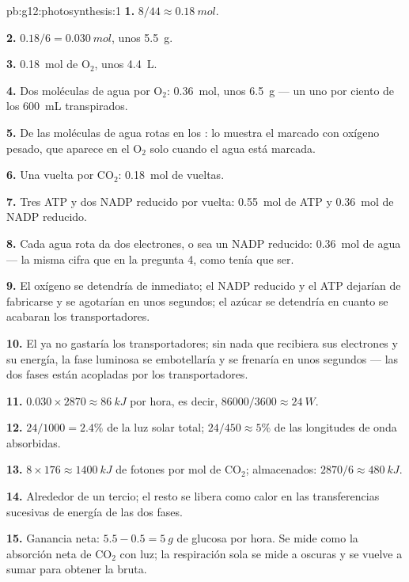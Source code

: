 \begin{solution}{pb:g12:photosynthesis:1}
\textbf{1.} $8/44 \approx \qty{0.18}{mol}$.

\textbf{2.} $0.18/6 = \qty{0.030}{mol}$, unos \qty{5.5}{g}.

\textbf{3.} \qty{0.18}{mol} de $\mathrm{O_2}$, unos \qty{4.4}{L}.

\textbf{4.} Dos moléculas de agua por $\mathrm{O_2}$: \qty{0.36}{mol},
unos \qty{6.5}{g} --- un uno por ciento de los \qty{600}{mL}
transpirados.

\textbf{5.} De las moléculas de agua rotas en los : lo
muestra el marcado con oxígeno pesado, que aparece en el
$\mathrm{O_2}$ solo cuando el agua está marcada.

\textbf{6.} Una vuelta por $\mathrm{CO_2}$: \qty{0.18}{mol} de vueltas.

\textbf{7.} Tres ATP y dos NADP reducido por vuelta: \qty{0.55}{mol} de
ATP y \qty{0.36}{mol} de NADP reducido.

\textbf{8.} Cada agua rota da dos electrones, o sea un NADP reducido:
\qty{0.36}{mol} de agua --- la misma cifra que en la pregunta 4, como
tenía que ser.

\textbf{9.} El oxígeno se detendría de inmediato; el NADP reducido y el
ATP dejarían de fabricarse y se agotarían en unos segundos; el azúcar
se detendría en cuanto se acabaran los transportadores.

\textbf{10.} El  ya no gastaría los transportadores; sin
nada que recibiera sus electrones y su energía, la fase luminosa se
embotellaría y se frenaría en unos segundos --- las dos fases están
acopladas por los transportadores.

\textbf{11.} $0.030 \times 2870 \approx \qty{86}{kJ}$ por hora, es
decir, $86000/3600 \approx \qty{24}{W}$.

\textbf{12.} $24/1000 = 2.4\%$ de la luz solar total; $24/450 \approx
5\%$ de las longitudes de onda absorbidas.

\textbf{13.} $8 \times 176 \approx \qty{1400}{kJ}$ de fotones por mol
de $\mathrm{CO_2}$; almacenados: $2870/6 \approx \qty{480}{kJ}$.

\textbf{14.} Alrededor de un tercio; el resto se libera como calor en
las transferencias sucesivas de energía de las dos fases.

\textbf{15.} Ganancia neta: $5.5 - 0.5 = \qty{5}{g}$ de glucosa por
hora. Se mide como la absorción neta de $\mathrm{CO_2}$ con luz; la
respiración sola se mide a oscuras y se vuelve a sumar para obtener la
 bruta.


\end{solution}
